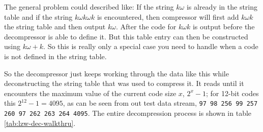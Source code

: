 \begin{refsection}
\newcommand{\ko}{\ensuremath{k\omega}\xspace}
\newcommand{\kok}{\ensuremath{\ko k}\xspace}
\newcommand{\kokok}{\ensuremath{\kok \omega k}\xspace}

The general problem could described like: If the string \ko is already
in the string table and if the string \kokok is encountered, then
compressor will first add \kok the string table and then output
\ko. After the code for \kok is output before the decompressor is able
to define it. But this table entry can then be constructed using $\ko
+k$.  So this is really only a special case you need to handle when a
code is not defined in the string table.

So the decompressor just keeps working through the data like this while
deconstructing the string table that was used to compress it. It reads
until it encounters the maximum value of the current code size $x$,
$2^{x}-1$; for 12-bit codes this $2^{12} - 1 = 4095$, as can be seen
from out test data stream, \texttt{97 98 256 99 257 260 97 262 263 264
  4095}. The entire decompression process is shown in table \ref{tab:lzw-dec-walkthru}.

\begin{table}
  \centering
  \noindent{}
\end{table}
\end{refsection}
